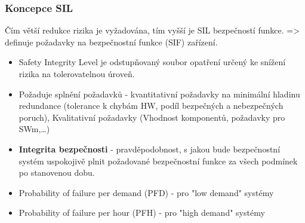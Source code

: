\subsubsection*{Koncepce SIL}
Čím větší redukce rizika je vyžadována, tím vyšší je SIL bezpečností funkce. => definuje požadavky na bezpečnostní funkce (SIF) zařízení.
\begin{itemize}
    \item Safety Integrity Level je odstupňovaný soubor opatření určený ke snížení rizika na tolerovatelnou úroveň.
    \item Požaduje splnění požadavků - kvantitativní požadavky na minimální hladinu redundance (tolerance k chybám HW, podíl bezpečných a nebezpečných poruch), Kvalitativní požadavky (Vhodnost komponentů, požadavky pro SWm,\dots)
    \item \textbf{Integrita bezpečnosti} - pravděpodobnost, s jakou bude bezpečnostní systém uspokojivě plnit požadované bezpečnostní funkce za všech podmínek po stanovenou dobu.
    \item Probability of failure per demand (PFD) - pro "low demand" systémy
    \item Probability of failure per hour (PFH) - pro "high demand" systémy
\end{itemize}

